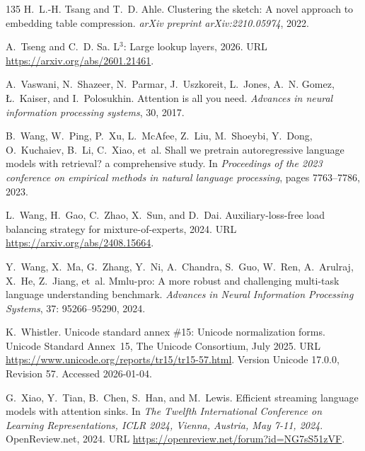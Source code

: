 \begin{thebibliography}{135}
H.~L.-H. Tsang and T.~D. Ahle.
\newblock Clustering the sketch: A novel approach to embedding table
  compression.
\newblock \emph{arXiv preprint arXiv:2210.05974}, 2022.

A.~Tseng and C.~D. Sa.
\newblock L$^3$: Large lookup layers, 2026.
\newblock URL \url{https://arxiv.org/abs/2601.21461}.

A.~Vaswani, N.~Shazeer, N.~Parmar, J.~Uszkoreit, L.~Jones, A.~N. Gomez,
  {\L}.~Kaiser, and I.~Polosukhin.
\newblock Attention is all you need.
\newblock \emph{Advances in neural information processing systems}, 30, 2017.

B.~Wang, W.~Ping, P.~Xu, L.~McAfee, Z.~Liu, M.~Shoeybi, Y.~Dong, O.~Kuchaiev,
  B.~Li, C.~Xiao, et~al.
\newblock Shall we pretrain autoregressive language models with retrieval? a
  comprehensive study.
\newblock In \emph{Proceedings of the 2023 conference on empirical methods in
  natural language processing}, pages 7763--7786, 2023.

L.~Wang, H.~Gao, C.~Zhao, X.~Sun, and D.~Dai.
\newblock Auxiliary-loss-free load balancing strategy for mixture-of-experts,
  2024{}.
\newblock URL \url{https://arxiv.org/abs/2408.15664}.

Y.~Wang, X.~Ma, G.~Zhang, Y.~Ni, A.~Chandra, S.~Guo, W.~Ren, A.~Arulraj, X.~He,
  Z.~Jiang, et~al.
\newblock Mmlu-pro: A more robust and challenging multi-task language
  understanding benchmark.
\newblock \emph{Advances in Neural Information Processing Systems},
  37: 95266--95290, 2024{}.

K.~Whistler.
\newblock Unicode standard annex \#15: Unicode normalization forms.
\newblock Unicode Standard Annex~15, The Unicode Consortium, July 2025.
\newblock URL \url{https://www.unicode.org/reports/tr15/tr15-57.html}.
\newblock Version Unicode 17.0.0, Revision 57. Accessed 2026-01-04.

G.~Xiao, Y.~Tian, B.~Chen, S.~Han, and M.~Lewis.
\newblock Efficient streaming language models with attention sinks.
\newblock In \emph{The Twelfth International Conference on Learning
  Representations, {ICLR} 2024, Vienna, Austria, May 7-11, 2024}.
  OpenReview.net, 2024.
\newblock URL \url{https://openreview.net/forum?id=NG7sS51zVF}.


\end{thebibliography}
